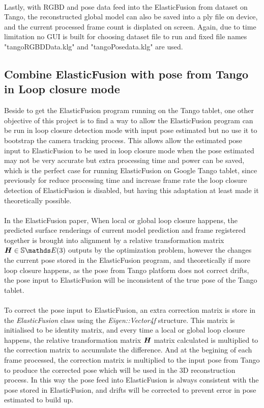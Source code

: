 \documentclass[12pt,twoside]{article}
\begin{document}
\\
Lastly, with RGBD and pose data feed into the ElasticFusion from dataset on Tango, the reconstructed global model can also be saved into a ply file on device, and the current processed frame count is displated on screen. Again, due to time limitation no GUI is built for choosing dataset file to run and fixed file names "tangoRGBDData.klg" and "tangoPosedata.klg" are used.\\






\newpage




\subsection{Combine ElasticFusion with pose from Tango in Loop closure mode}
Beside to get the ElasticFusion program running on the Tango tablet, one other objective of this project is to find a way to allow the ElasticFusion program can be run in loop closure detection mode with input pose estimated but no use it to bootstrap the camera tracking process. This allows allow the estimated pose input to ElasticFusion to be used in loop closure mode when the pose estimated may not be very accurate but extra processing time and power can be saved, which is the perfect case for running ElasticFusion on Google Tango tablet, since previously for reduce processing time and increase frame rate the loop closure detection of ElasticFusion is disabled, but having this adaptation at least made it theoretically possible. \\
\\
In the ElasticFusion\citep{whelan2016elasticfusion} paper, When local or global loop closure happens, the predicted surface renderings of current model prediction and frame registered together is brought into alignment by a relative transformation matrix $\mat H \in \mathbb{S}\E(3)$ outputs by the optimization problem, however the changes the current pose stored in the ElasticFusion program, and theoretically if more loop closure happens, as the pose from Tango platform does not correct drifts, the pose input to ElasticFusion will be inconsistent of the true pose of the Tango tablet.\\
\\
To correct the pose input to ElasticFusion, an extra correction matrix is store in the \textit{ElasticFusion} class using the \textit{Eigen::Vector4f} structure. This matrix is initialised to be identity matrix, and every time a local or global loop closure happens, the relative transformation matrix ${\boldsymbol{{H}}}$ matrix calculated is multiplied to the correction matrix to accumulate the difference. And at the begining of each frame processed, the correction matrix is multiplied to the input pose from Tango to produce the corrected pose which will be used in the 3D reconstruction process. In this way the pose feed into ElasticFusion is always consistent with the pose stored in ElasticFusion, and drifts will be corrected to prevent error in pose estimated to build up.\\
\end{document}
